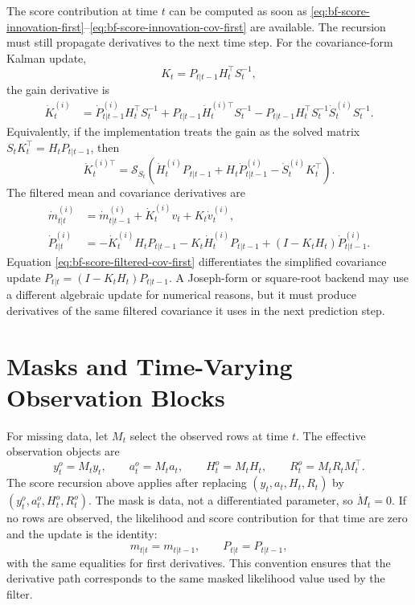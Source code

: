 The score contribution at time $t$ can be computed as soon as
\eqref{eq:bf-score-innovation-first}--\eqref{eq:bf-score-innovation-cov-first}
are available.  The recursion must still propagate derivatives to the next time
step.  For the covariance-form Kalman update,
\[
  K_t=P_{t|t-1}H_t^\top S_t^{-1},
\]
the gain derivative is
\begin{align}
\label{eq:bf-score-gain-first}
  \dot K_t^{(i)}
  &=
  \dot P_{t|t-1}^{(i)}H_t^\top S_t^{-1}
  +P_{t|t-1}\dot H_t^{(i)\top}S_t^{-1}
  -P_{t|t-1}H_t^\top S_t^{-1}\dot S_t^{(i)}S_t^{-1}.
\end{align}
Equivalently, if the implementation treats the gain as the solved matrix
$S_tK_t^\top=H_tP_{t|t-1}$, then
\begin{equation}
\label{eq:bf-score-gain-first-solve}
  \dot K_t^{(i)\top}
  =
  \mathcal{S}_{S_t}
  \left(
    \dot H_t^{(i)}P_{t|t-1}
    +H_t\dot P_{t|t-1}^{(i)}
    -\dot S_t^{(i)}K_t^\top
  \right).
\end{equation}
The filtered mean and covariance derivatives are
\begin{align}
\label{eq:bf-score-filtered-mean-first}
  \dot m_{t|t}^{(i)}
  &=
  \dot m_{t|t-1}^{(i)}
  +\dot K_t^{(i)}v_t
  +K_t\dot v_t^{(i)},\\
\label{eq:bf-score-filtered-cov-first}
  \dot P_{t|t}^{(i)}
  &=
  -\dot K_t^{(i)}H_tP_{t|t-1}
  -K_t\dot H_t^{(i)}P_{t|t-1}
  +(I-K_tH_t)\dot P_{t|t-1}^{(i)}.
\end{align}
Equation \eqref{eq:bf-score-filtered-cov-first} differentiates the simplified
covariance update $P_{t|t}=(I-K_tH_t)P_{t|t-1}$.  A Joseph-form or square-root
backend may use a different algebraic update for numerical reasons, but it must
produce derivatives of the same filtered covariance it uses in the next
prediction step.

\section{Masks and Time-Varying Observation Blocks}
\label{sec:bf-score-masks}

For missing data, let $M_t$ select the observed rows at time $t$.  The effective
observation objects are
\[
  y_t^o=M_ty_t,\qquad
  a_t^o=M_ta_t,\qquad
  H_t^o=M_tH_t,\qquad
  R_t^o=M_tR_tM_t^\top .
\]
The score recursion above applies after replacing
$(y_t,a_t,H_t,R_t)$ by $(y_t^o,a_t^o,H_t^o,R_t^o)$.  The mask is data, not a
differentiated parameter, so $\dot M_t=0$.  If no rows are observed, the
likelihood and score contribution for that time are zero and the update is the
identity:
\[
  m_{t|t}=m_{t|t-1},\qquad
  P_{t|t}=P_{t|t-1},
\]
with the same equalities for first derivatives.  This convention ensures that
the derivative path corresponds to the same masked likelihood value used by the
filter.

